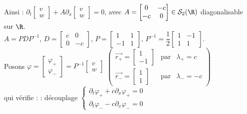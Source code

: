\documentclass[12pt,a4paper]{article}
\begin{document}
	Ainsi : $\partial_t\begin{bmatrix}
		v \\ w
	\end{bmatrix} + A\partial_x\begin{bmatrix}
		v \\ w
	\end{bmatrix} = 0$, avec $A = \begin{bmatrix}
		0 & - c \\-c & 0
	\end{bmatrix} \in \mathcal S_2(\R)$ diagonalisable sur $\R$.\\
	$A = PDP^{-1}$, $D = \begin{bmatrix}
		c & 0 \\0 & -c
	\end{bmatrix}$, $P = \begin{bmatrix}
		1 & 1 \\
		-1 & 1
	\end{bmatrix}$, $P ^{-1} = \dfrac12\begin{bmatrix}
		1 & -1\\
		1 & 1
	\end{bmatrix}$.\\
	
	Posons $\varphi = \begin{bmatrix}
		\varphi_+\\
		\varphi_-
	\end{bmatrix} = P^{-1}\begin{bmatrix}
		v \\
		w
	\end{bmatrix}$ \hspace{2cm} $\left(\begin{aligned}
		\vec{r_+} = \begin{bmatrix}
			1 \\
			-1
		\end{bmatrix} & \text{par} & \lambda_+ = c \\
		\vec{r_-} = \begin{bmatrix}
			1\\
			1
		\end{bmatrix} & \text{par} & \lambda_- = -c
	\end{aligned}\right)$\\
	
	qui vérifie :  : découplage $\begin{cases}
		\partial_t \varphi_+ + c \partial_x \varphi_+ = 0 \\
		\partial_t \varphi_- - c \partial_x \varphi_- = 0
	\end{cases}$\\
	
\end{document}
